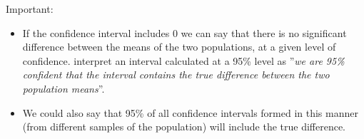 \documentclass{beamer}
\begin{document}
\begin{frame}Important:
	\begin{itemize}
		\item 	If the confidence interval includes 0 we can say that there is no
		significant difference between the means of the two populations, at
		a given level of confidence.
		interpret an interval calculated at a 95\% level as ”\textit{we are 95\%
			confident that the interval contains the true difference between the
			two population means}”. 
		\item We could also say that 95\% of all
		confidence intervals formed in this manner (from different samples
		of the population) will include the true difference.
	\end{itemize}
\end{frame}
\end{document}
